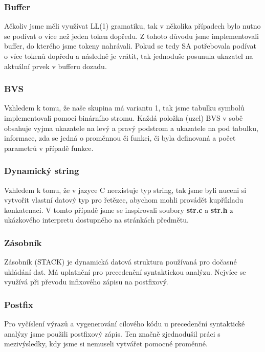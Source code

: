 \documentclass[a4paper, 12pt]{article}
\begin{document}
\subsubsection{Buffer}

Ačkoliv jsme měli využívat LL(1) gramatiku, tak v několika případech bylo nutno se podívat o více než jeden token dopředu. Z tohoto důvodu jsme implementovali buffer, do kterého jsme tokeny nahrávali. Pokud se tedy SA potřebovala podívat o více tokenů dopředu a následně je vrátit, tak jednoduše posunula ukazatel na aktuální prvek v bufferu dozadu.

\subsubsection{BVS}

Vzhledem k tomu, že naše skupina má variantu 1, tak jsme tabulku symbolů implementovali pomocí binárního stromu. Každá položka (uzel) BVS v sobě obsahuje vyjma ukazatele na levý a pravý podstrom a ukazatele na pod tabulku, informace, zda se jedná o proměnnou či funkci, či byla definovaná a počet parametrů v případě funkce.

\subsubsection{Dynamický string}

Vzhledem k tomu, že v jazyce C neexistuje typ string, tak jsme byli nuceni si vytvořit vlastní datový typ pro řetězec, abychom mohli provádět kupříkladu konkatenaci. V tomto případě jsme se inspirovali soubory 	{\bf str.c} a {\bf str.h} z ukázkového interpretu dostupného na stránkách předmětu.

\subsubsection{Zásobník}

Zásobník (STACK) je dynamická datová struktura používaná pro dočasné ukládání dat. 
Má uplatnění pro precedenční syntaktickou analýzu. Nejvíce se využívá při převodu infixového zápisu na postfixový.

\subsubsection{Postfix}

Pro vyčíslení výrazů a vygenerování cílového kódu u precedenční syntaktické analýzy jsme použili postfixový zápis. Ten značně zjednodušil práci s mezivýsledky, kdy jsme si nemuseli vytvářet pomocné proměnné. 
\end{document}
